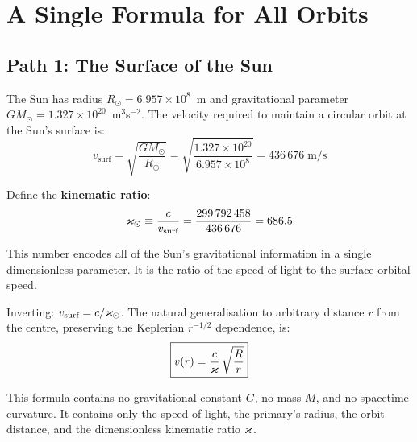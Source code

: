 
\chapter{A Single Formula for All Orbits}
\label{ch:single-formula}


\section{Path 1: The Surface of the Sun}
\label{sec:path1}

The Sun has radius $R_\odot = 6.957 \times 10^8$~m and gravitational parameter $GM_\odot = 1.327 \times 10^{20}$~m$^3$s$^{-2}$.  The velocity required to maintain a circular orbit at the Sun's surface is:
\begin{equation}\label{eq:v-surf-sun}
  v_{\text{surf}} = \sqrt{\frac{GM_\odot}{R_\odot}} = \sqrt{\frac{1.327 \times 10^{20}}{6.957 \times 10^{8}}} = 436\,676\;\text{m/s}
\end{equation}

Define the \textbf{kinematic ratio}:
\begin{equation}\label{eq:kop-sun}
  \varkappa_\odot \equiv \frac{c}{v_{\text{surf}}} = \frac{299\,792\,458}{436\,676} = 686.5
\end{equation}

This number encodes all of the Sun's gravitational information in a single dimensionless parameter.  It is the ratio of the speed of light to the surface orbital speed.

Inverting: $v_{\text{surf}} = c/\varkappa_\odot$.  The natural generalisation to arbitrary distance $r$ from the centre, preserving the Keplerian $r^{-1/2}$ dependence, is:
\begin{equation}\label{eq:v-general}
  \boxed{v(r) = \frac{c}{\varkappa}\,\sqrt{\frac{R}{r}}}
\end{equation}

This formula contains no gravitational constant $G$, no mass $M$, and no spacetime curvature.  It contains only the speed of light, the primary's radius, the orbit distance, and the dimensionless kinematic ratio $\varkappa$.


